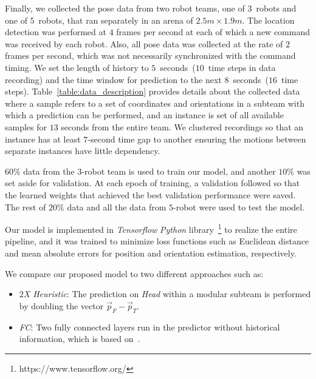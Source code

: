 \documentclass[letterpaper, 10 pt, conference]{ieeeconf}  %
\begin{document}
    Finally, we collected the pose data from two robot teams, one of
    $3$~robots and one of $5$~robots, that ran separately in an arena of
    $2.5 m \times 1.9 m$. The location detection was performed at $4$
    frames per second at each of which a new command was received by
    each robot. Also, all pose data was collected at the rate of $2$
    frames per second, which was not necessarily synchronized with the
    command timing. We set the length of history to
    $5$~seconds~($10$~time steps in data recording) and the time window
    for prediction to the next $8$~seconds~($16$~time steps).
    Table~\ref{table:data_description} provides details about the
    collected data where a sample refers to a set of coordinates and
    orientations in a subteam with which a prediction can be performed,
    and an instance is set of all available samples for $13$ seconds
    from the entire team. We clustered recordings so that an instance
    has at least $7$-second time gap to another ensuring the motions
    between separate instances have little dependency.

    $60$\% data from the $3$-robot team is used to train our model, and
    another $10\%$ was set aside for validation. At each epoch of
    training, a validation followed so that the learned weights that
    achieved the best validation performance were saved. The rest of
    $20\%$ data and all the data from $5$-robot were used to test the
    model.

    Our model is implemented in \emph{Tensorflow} \emph{Python}
    library~\footnote{https://www.tensorflow.org/} to realize the entire
    pipeline, and it was trained to minimize loss functions such as
    Euclidean distance and mean absolute errors for position and
    orientation estimation, respectively.

	We compare our proposed model to two different approaches such as:
	\begin{itemize}
		\item \emph{$2$X Heuristic}:
            The prediction on \emph{Head} within a modular subteam is
            performed by doubling the vector $\vec{p}_{F} -
            \vec{p}_{T}$.

		\item \emph{FC}:
            Two fully connected layers run in the predictor without
            historical information, which is based on~\cite{CPR17}.

	\end{itemize}
\end{document}
